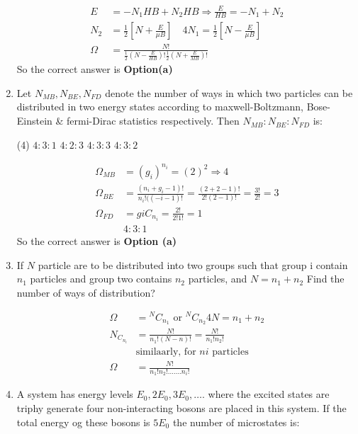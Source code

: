 \begin{enumerate}
\begin{answer}
\begin{align*}
	E&=-N_{1} H B+N_{2} H B \Rightarrow \frac{E}{H B}=-N_{1}+N_{2}\\
	N_{2}&=\frac{1}{2}\left[N+\frac{E}{\mu B}\right] \quad 4 N_{1}=\frac{1}{2}\left[N-\frac{E}{\mu B}\right]\\
	\Omega&=\frac{N !}{\frac{1}{2}\left(N-\frac{E}{H B}\right) ! \frac{1}{2}\left(N+\frac{E}{M B}\right) !}
	\end{align*}
	So the correct answer is \textbf{Option(a)}
\end{answer}	
\item Let $N_{M B}, N_{B E}, N_{F D}$ denote the number of ways in which two particles can be distributed in two energy states according to maxwell-Boltzmann, Bose-Einstein \& fermi-Dirac statistics respectively. Then $N_{M B}: N_{B E}: N_{F D}$ is:
\begin{tasks}(4)
	\task[\textbf{a.}]$4: 3: 1$
	\task[\textbf{b.}] $4: 2: 3$
	\task[\textbf{c.}]$4: 3: 3$
	\task[\textbf{d.}] $4: 3: 2$
\end{tasks}
\begin{answer}
	\begin{align*}
	\Omega_{M B}&=\left(g_{i}\right)^{n_{i}}=(2)^{2} \Rightarrow 4 \\
	\Omega_{B E}&=\frac{\left(n_{i}+g_{i}-1\right) !}{n_{i} !((-i-1) !}=\frac{(2+2-1) !}{2 !(2-1) !}=\frac{3 !}{2 !}=3\\
	\Omega_{F D}&=g i C_{n_{i}}=\frac{2 !}{2 ! 1 !}=1\\
	&4:3:1
	\end{align*}
	So the correct answer is \textbf{Option (a)}
\end{answer}
\item  If $N$ particle are to be distributed into two groups such that group i contain $n_1$ particles and group two contains $n_2$ particles, and $N=n_1+n_2$ Find the number of ways of distribution?
\begin{answer}
	\begin{align*}
	\Omega&={ }^{N} C_{n_{1}} \text { or }{ }^{N} C_{n_{2}} 4 N=n_{1}+n_{2}\\
	N_{C_{n_{i}}}&=\frac{N !}{n_{1} !(N-n) !}=\frac{N !}{n_{1} ! n_{2} !}\\
	&\text{similaarly, for $ni$ particles}\\
	\Omega&=\frac{N!}{n_1!n_2!.......n_i!}
	\end{align*}
\end{answer}
\item  A system has energy levels $E_{0}, 2 E_{0}, 3 E_{0}, \ldots .$ where the excited states are triphy generate four non-interacting bosons are placed in this system. If the total energy og these bosons is $5E_0$ the number of microstates is:

\end{enumerate}
